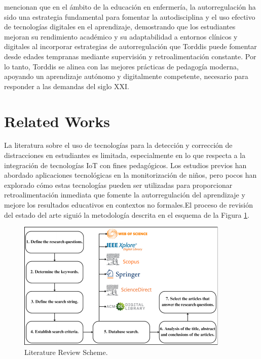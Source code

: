 \documentclass[a4paper,fleqn]{cas-sc}
\begin{document}
			\cite{Coffman2024Developing} mencionan que en el ámbito de la educación en enfermería, la autorregulación ha sido una estrategia fundamental para fomentar la autodisciplina y el uso efectivo de tecnologías digitales en el aprendizaje, demostrando que los estudiantes mejoran su rendimiento académico y su adaptabilidad a entornos clínicos y digitales al incorporar estrategias de autorregulación que Torddis puede fomentar desde edades tempranas mediante supervisión y retroalimentación constante. Por lo tanto, Torddis se alinea con las mejores prácticas de pedagogía moderna, apoyando un aprendizaje autónomo y digitalmente competente, necesario para responder a las demandas del siglo XXI.
	
	\section{Related Works}
	\label{seccion:Tres}
		La literatura sobre el uso de tecnologías para la detección y corrección de distracciones en estudiantes es limitada, especialmente en lo que respecta a la integración de tecnologías IoT con fines pedagógicos. Los estudios previos han abordado aplicaciones tecnológicas en la monitorización de niños, pero pocos han explorado cómo estas tecnologías pueden ser utilizadas para proporcionar retroalimentación inmediata que fomente la autorregulación del aprendizaje y mejore los resultados educativos en contextos no formales.El proceso de revisión del estado del arte siguió la metodología descrita en el esquema de la Figura \ref{fig:LRS}.
		
		\begin{figure}[h]
			\includegraphics[width=\textwidth]{Figure_1}
			\caption{Literature Review Scheme.}
			\label{fig:LRS}
		\end{figure}   
		
\end{document}
